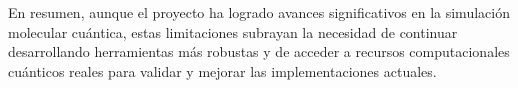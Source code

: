 En resumen, aunque el proyecto ha logrado avances significativos en la simulación molecular cuántica, estas limitaciones subrayan la necesidad de continuar desarrollando herramientas más robustas y de acceder a recursos computacionales cuánticos reales para validar y mejorar las implementaciones actuales.

